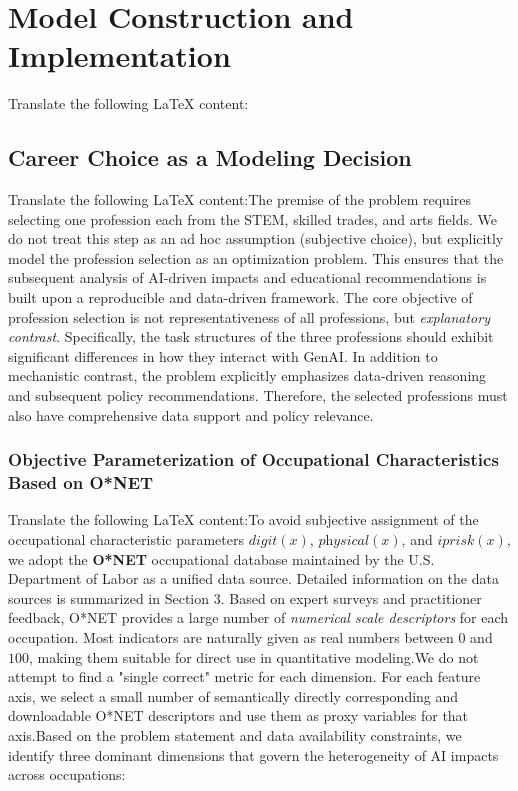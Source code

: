 \section{Model Construction and Implementation}Translate the following LaTeX content:\subsection{Career Choice as a Modeling Decision}Translate the following LaTeX content:The premise of the problem requires selecting one profession each from the STEM, skilled trades, and arts fields.  
We do not treat this step as an ad hoc assumption (subjective choice), but explicitly model the profession selection as an optimization problem.  
This ensures that the subsequent analysis of AI-driven impacts and educational recommendations is built upon a reproducible and data-driven framework.  
The core objective of profession selection is not representativeness of all professions, but \emph{explanatory contrast}.  
Specifically, the task structures of the three professions should exhibit significant differences in how they interact with GenAI.  
In addition to mechanistic contrast, the problem explicitly emphasizes data-driven reasoning and subsequent policy recommendations. Therefore, the selected professions must also have comprehensive data support and policy relevance.\subsubsection{Objective Parameterization of Occupational Characteristics Based on O*NET}Translate the following LaTeX content:To avoid subjective assignment of the occupational characteristic parameters $\textit{digit}(x)$, $\textit{physical}(x)$, and $\textit{iprisk}(x)$, we adopt the \textbf{O*NET} occupational database maintained by the U.S. Department of Labor as a unified data source. Detailed information on the data sources is summarized in Section 3.
Based on expert surveys and practitioner feedback, O*NET provides a large number of \emph{numerical scale descriptors} for each occupation. Most indicators are naturally given as real numbers between $0$ and $100$, making them suitable for direct use in quantitative modeling.We do not attempt to find a "single correct" metric for each dimension. For each feature axis, we select a small number of semantically directly corresponding and downloadable O*NET descriptors and use them as proxy variables for that axis.Based on the problem statement and data availability constraints, we identify three dominant dimensions that govern the heterogeneity of AI impacts across occupations:
